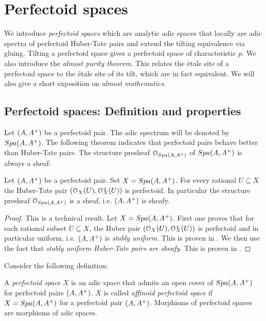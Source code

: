 \section{Perfectoid spaces}
We introduce \emph{perfectoid spaces} which are analytic adic spaces that locally are adic spectra of perfectoid Huber-Tate pairs and extend the tilting equivalence via gluing. Tilting a perfectoid space gives a perfectoid space of characteristic $p$. We also introduce the \emph{almost purity theorem}. This relates the \'etale site of a perfectoid space to the \'etale site of its tilt, which are in fact equivalent. We will also give a short exposition on \emph{almost mathematics}.

\subsection{Perfectoid spaces: Definition and properties}
Let $(A,A{^{+}})$ be a perfectoid pair. The adic spectrum will be denoted by ${Spa({A},{A{^{+}}})}$. The following theorem indicates that perfectoid pairs behave better than Huber-Tate pairs.
The structure presheaf $\mathcal{O}_{{Spa({A},{A{^{+}}})}}$ of ${Spa({A},{A{^{+}}})}$ is always a sheaf:

\begin{theorem}
Let $(A,A{^{+}})$ be a perfectoid pair. Set $X={Spa({A},{A{^{+}}})}$.
For every rational
$U\subseteq X$ the Huber-Tate pair $(\mathcal{O}_{X}(U),\mathcal{O}{^{+}}\!\!\!\!_X(U))$ is perfectoid.
In particular the structure presheaf $\mathcal{O}_{{Spa({A},{A{^{+}}})}}$ is a sheaf, i.e. $(A,A{^{+}})$ is sheafy.
\end{theorem}
\begin{proof}
This is a technical result. Let $X={Spa({A},{A{^{+}}})}$.
First one proves that for each rational subset $U\subseteq X$, the Huber pair $(\mathcal{O}_{X}(U),\mathcal{O}{^{+}}\!\!\!\!_X(U))$ is perfectoid and in particular uniform, i.e. $(A,A{^{+}})$ is \emph{stably uniform}. This is proven in \cite{Scholze12}.
We then use the fact that \emph{stably uniform Huber-Tate pairs are sheafy}. This is proven in \cite[theorem IV.1.1.5]{Morel19}.
\end{proof}

Consider the following definition:
\begin{definition}\label{definitionperfectoidspaces}
A \emph{perfectoid space} $X$ is an adic space that admits an open cover of ${Spa({A},{A{^{+}}})}$ for perfectoid pairs 
$(A,A{^{+}})$.
$X$ is called \emph{affinoid perfectoid space} if $X={Spa({A},{A{^{+}}})}$ for a perfectoid pair $(A,A{^{+}})$.
Morphisms of perfectoid spaces are morphisms of adic spaces.
\end{definition}

